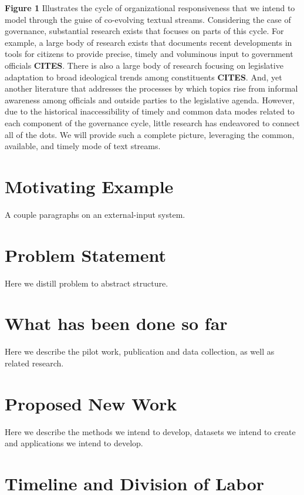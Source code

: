 {\bf Figure 1} Illustrates the cycle of organizational responsiveness that we intend to model through the guise of co-evolving textual streams. Considering the case of governance, substantial research exists that focuses on parts of this cycle. For example, a large body of research exists that documents recent developments in tools for citizens to provide precise, timely and voluminous input to government officials {\bf CITES}. There is also a large body of research focusing on legislative adaptation to broad ideological trends among constituents {\bf CITES}.  And, yet another literature that addresses the processes by which topics rise from informal awareness among officials and outside parties to the legislative agenda. However, due to the historical inaccessibility of timely and common data modes related to each component of the governance cycle, little research has endeavored to connect all of the dots. We will provide such a complete picture, leveraging the common, available, and timely mode of text streams.

\section{Motivating Example}

A couple paragraphs on an external-input system.

\section{Problem Statement}

Here we distill problem to abstract structure.

\section{What has been done so far}

Here we describe the pilot work, publication and data collection, as well as related research.

\section{Proposed New Work}

Here we describe the methods we intend to develop, datasets we intend to create and applications we intend to develop.

\section{Timeline and Division of Labor}

